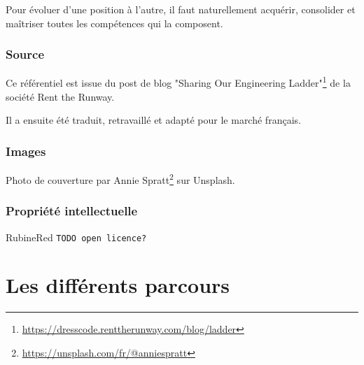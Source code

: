 \documentclass[a4paper, french, openany, 12pt]{book}
\newcommand{\fullwidthimage}[1]{
  \begin{center}
    \makebox[\textwidth]{\texttt{[image: \#1]}}
  \end{center}
}
\newcommand{\todo}[1]{
  \begin{color}{RubineRed}
    \texttt{TODO {#1}}
  \end{color}
}
\begin{document}
\begin{multicols}{2}
  Pour évoluer d'une position à l'autre, il faut naturellement acquérir, consolider et maîtriser toutes les compétences
  qui la composent.
  
  \section*{Source}
  
  Ce référentiel est issue du post de blog 
  "Sharing Our Engineering Ladder"\footnote{\url{https://dresscode.renttherunway.com/blog/ladder}}
  de la société Rent the Runway.
  
  Il a ensuite été traduit, retravaillé et adapté pour le marché français.
  
  \section*{Images}
  
  Photo de couverture par Annie Spratt\footnote{\url{https://unsplash.com/fr/@anniespratt}} sur Unsplash.
  
  \section*{Propriété intellectuelle}
  
  \todo{open licence?}
  
\end{multicols}
  
\mainmatter

\part{Les différents parcours}

\fullwidthimage{images/tracks.png}
\end{document}

